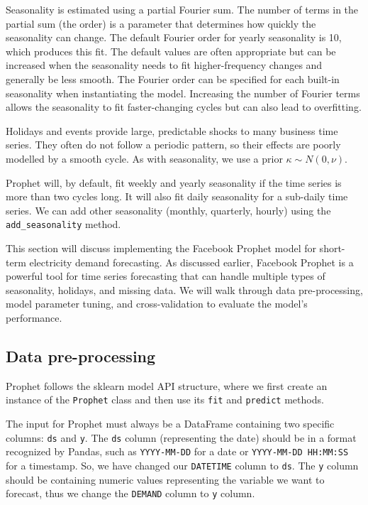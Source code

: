 \documentclass[mstat,12pt]{unswthesis}
\begin{document}
Seasonality is estimated using a partial Fourier sum. The number of
terms in the partial sum (the order) is a parameter that determines how
quickly the seasonality can change. The default Fourier order for yearly
seasonality is 10, which produces this fit. The default values are often
appropriate but can be increased when the seasonality needs to fit
higher-frequency changes and generally be less smooth. The Fourier order
can be specified for each built-in seasonality when instantiating the
model. Increasing the number of Fourier terms allows the seasonality to
fit faster-changing cycles but can also lead to overfitting.

Holidays and events provide large, predictable shocks to many business
time series. They often do not follow a periodic pattern, so their
effects are poorly modelled by a smooth cycle. As with seasonality, we
use a prior \(\kappa \sim {N(0,\nu)}\).

Prophet will, by default, fit weekly and yearly seasonality if the time
series is more than two cycles long. It will also fit daily seasonality
for a sub-daily time series. We can add other seasonality (monthly,
quarterly, hourly) using the \texttt{add\_seasonality} method.

This section will discuss implementing the Facebook Prophet model for
short-term electricity demand forecasting. As discussed earlier,
Facebook Prophet is a powerful tool for time series forecasting that can
handle multiple types of seasonality, holidays, and missing data. We
will walk through data pre-processing, model parameter tuning, and
cross-validation to evaluate the model's performance.

\hypertarget{data-pre-processing}{%
\subsection{Data pre-processing}\label{data-pre-processing}}

Prophet follows the sklearn model API structure, where we first create
an instance of the \texttt{Prophet} class and then use its \texttt{fit}
and \texttt{predict} methods.

The input for Prophet must always be a DataFrame containing two specific
columns: \texttt{ds} and \texttt{y}. The \texttt{ds} column
(representing the date) should be in a format recognized by Pandas, such
as \texttt{YYYY-MM-DD} for a date or \texttt{YYYY-MM-DD\ HH:MM:SS} for a
timestamp. So, we have changed our \texttt{DATETIME} column to
\texttt{ds}. The \texttt{y} column should be containing numeric values
representing the variable we want to forecast, thus we change the
\texttt{DEMAND} column to \texttt{y} column.
\end{document}
